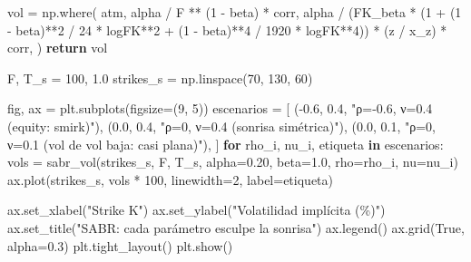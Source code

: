 \documentclass[
  spanish,
  letterpaper,
  DIV=11,
  numbers=noendperiod]{scrreprt}
\newenvironment{Shaded}{\begin{snugshade}}{\end{snugshade}}
\newcommand{\ControlFlowTok}[1]{\textcolor[rgb]{0.00,0.23,0.31}{\textbf{#1}}}
\newcommand{\DecValTok}[1]{\textcolor[rgb]{0.68,0.00,0.00}{#1}}
\newcommand{\FloatTok}[1]{\textcolor[rgb]{0.68,0.00,0.00}{#1}}
\newcommand{\KeywordTok}[1]{\textcolor[rgb]{0.00,0.23,0.31}{\textbf{#1}}}
\newcommand{\NormalTok}[1]{\textcolor[rgb]{0.00,0.23,0.31}{#1}}
\newcommand{\OperatorTok}[1]{\textcolor[rgb]{0.37,0.37,0.37}{#1}}
\newcommand{\StringTok}[1]{\textcolor[rgb]{0.13,0.47,0.30}{#1}}
\newcommand{\VariableTok}[1]{\textcolor[rgb]{0.07,0.07,0.07}{#1}}
\begin{document}
\begin{Shaded}
\begin{Highlighting}[]
\NormalTok{    vol }\OperatorTok{=}\NormalTok{ np.where(}
\NormalTok{        atm,}
\NormalTok{        alpha }\OperatorTok{/}\NormalTok{ F }\OperatorTok{**}\NormalTok{ (}\DecValTok{1} \OperatorTok{{-}}\NormalTok{ beta) }\OperatorTok{*}\NormalTok{ corr,}
\NormalTok{        alpha }\OperatorTok{/}\NormalTok{ (FK\_beta }\OperatorTok{*}\NormalTok{ (}\DecValTok{1} \OperatorTok{+}\NormalTok{ (}\DecValTok{1} \OperatorTok{{-}}\NormalTok{ beta)}\OperatorTok{**}\DecValTok{2} \OperatorTok{/} \DecValTok{24} \OperatorTok{*}\NormalTok{ logFK}\OperatorTok{**}\DecValTok{2}
                            \OperatorTok{+}\NormalTok{ (}\DecValTok{1} \OperatorTok{{-}}\NormalTok{ beta)}\OperatorTok{**}\DecValTok{4} \OperatorTok{/} \DecValTok{1920} \OperatorTok{*}\NormalTok{ logFK}\OperatorTok{**}\DecValTok{4}\NormalTok{)) }\OperatorTok{*}\NormalTok{ (z }\OperatorTok{/}\NormalTok{ x\_z) }\OperatorTok{*}\NormalTok{ corr,}
\NormalTok{    )}
    \ControlFlowTok{return}\NormalTok{ vol}

\NormalTok{F, T\_s }\OperatorTok{=} \DecValTok{100}\NormalTok{, }\FloatTok{1.0}
\NormalTok{strikes\_s }\OperatorTok{=}\NormalTok{ np.linspace(}\DecValTok{70}\NormalTok{, }\DecValTok{130}\NormalTok{, }\DecValTok{60}\NormalTok{)}

\NormalTok{fig, ax }\OperatorTok{=}\NormalTok{ plt.subplots(figsize}\OperatorTok{=}\NormalTok{(}\DecValTok{9}\NormalTok{, }\DecValTok{5}\NormalTok{))}
\NormalTok{escenarios }\OperatorTok{=}\NormalTok{ [}
\NormalTok{    (}\OperatorTok{{-}}\FloatTok{0.6}\NormalTok{, }\FloatTok{0.4}\NormalTok{, }\StringTok{"ρ={-}0.6, ν=0.4 (equity: smirk)"}\NormalTok{),}
\NormalTok{    (}\FloatTok{0.0}\NormalTok{, }\FloatTok{0.4}\NormalTok{, }\StringTok{"ρ=0, ν=0.4 (sonrisa simétrica)"}\NormalTok{),}
\NormalTok{    (}\FloatTok{0.0}\NormalTok{, }\FloatTok{0.1}\NormalTok{, }\StringTok{"ρ=0, ν=0.1 (vol de vol baja: casi plana)"}\NormalTok{),}
\NormalTok{]}
\ControlFlowTok{for}\NormalTok{ rho\_i, nu\_i, etiqueta }\KeywordTok{in}\NormalTok{ escenarios:}
\NormalTok{    vols }\OperatorTok{=}\NormalTok{ sabr\_vol(strikes\_s, F, T\_s, alpha}\OperatorTok{=}\FloatTok{0.20}\NormalTok{, beta}\OperatorTok{=}\FloatTok{1.0}\NormalTok{, rho}\OperatorTok{=}\NormalTok{rho\_i, nu}\OperatorTok{=}\NormalTok{nu\_i)}
\NormalTok{    ax.plot(strikes\_s, vols }\OperatorTok{*} \DecValTok{100}\NormalTok{, linewidth}\OperatorTok{=}\DecValTok{2}\NormalTok{, label}\OperatorTok{=}\NormalTok{etiqueta)}

\NormalTok{ax.set\_xlabel(}\StringTok{"Strike K"}\NormalTok{)}
\NormalTok{ax.set\_ylabel(}\StringTok{"Volatilidad implícita (\%)"}\NormalTok{)}
\NormalTok{ax.set\_title(}\StringTok{"SABR: cada parámetro esculpe la sonrisa"}\NormalTok{)}
\NormalTok{ax.legend()}
\NormalTok{ax.grid(}\VariableTok{True}\NormalTok{, alpha}\OperatorTok{=}\FloatTok{0.3}\NormalTok{)}
\NormalTok{plt.tight\_layout()}
\NormalTok{plt.show()}
\end{Highlighting}
\end{Shaded}
\end{document}
